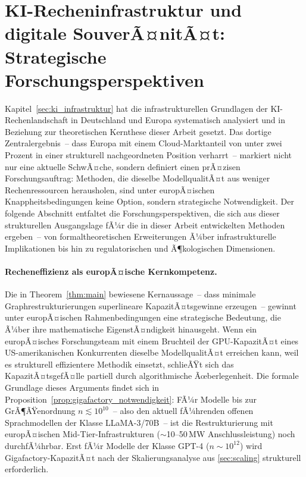﻿\documentclass[12pt, a4paper, openany]{report}
\begin{document}
\section{KI-Recheninfrastruktur und digitale SouverÃ¤nitÃ¤t:
  Strategische Forschungsperspektiven}
\label{sec:outlook_infrastruktur}

Kapitel~\ref{sec:ki_infrastruktur} hat die infrastrukturellen Grundlagen
der KI-Rechenlandschaft in Deutschland und Europa systematisch analysiert
und in Beziehung zur theoretischen Kernthese dieser Arbeit gesetzt.  Das
dortige Zentralergebnis~-- dass Europa mit einem Cloud-Marktanteil von
unter zwei Prozent in einer strukturell nachgeordneten Position verharrt~--
markiert nicht nur eine aktuelle SchwÃ¤che, sondern definiert einen
prÃ¤zisen Forschungsauftrag: Methoden, die dieselbe ModellqualitÃ¤t aus
weniger Rechenressourcen herausholen, sind unter europÃ¤ischen
Knappheitsbedingungen keine Option, sondern strategische Notwendigkeit.
Der folgende Abschnitt entfaltet die Forschungsperspektiven, die sich aus
dieser strukturellen Ausgangslage fÃ¼r die in dieser Arbeit entwickelten
Methoden ergeben~-- von formaltheoretischen Erweiterungen Ã¼ber
infrastrukturelle Implikationen bis hin zu regulatorischen und
Ã¶kologischen Dimensionen.

\paragraph{Recheneffizienz als europÃ¤ische Kernkompetenz.}
Die in Theorem~\ref{thm:main} bewiesene Kernaussage~-- dass minimale
Graphrestrukturierungen superlineare KapazitÃ¤tsgewinne erzeugen~-- gewinnt
unter europÃ¤ischen Rahmenbedingungen eine strategische Bedeutung, die Ã¼ber
ihre mathematische EigenstÃ¤ndigkeit hinausgeht.  Wenn ein europÃ¤isches
Forschungsteam mit einem Bruchteil der GPU-KapazitÃ¤t eines US-amerikanischen
Konkurrenten dieselbe ModellqualitÃ¤t erreichen kann, weil es strukturell
effizientere Methodik einsetzt, schlieÃŸt sich das KapazitÃ¤tsgefÃ¤lle
partiell durch algorithmische Ãœberlegenheit.  Die formale Grundlage dieses
Arguments findet sich in Proposition~\ref{prop:gigafactory_notwendigkeit}:
FÃ¼r Modelle bis zur GrÃ¶ÃŸenordnung $n \lesssim 10^{10}$~-- also den aktuell
fÃ¼hrenden offenen Sprachmodellen der Klasse LLaMA-3/70B~-- ist die
Restrukturierung mit europÃ¤ischen Mid-Tier-Infrastrukturen
($\sim$10--50\,MW Anschlussleistung) noch durchfÃ¼hrbar.  Erst fÃ¼r Modelle
der Klasse GPT-4 ($n \sim 10^{12}$) wird Gigafactory-KapazitÃ¤t nach der
Skalierungsanalyse aus \cref{sec:scaling} strukturell erforderlich.
\end{document}
